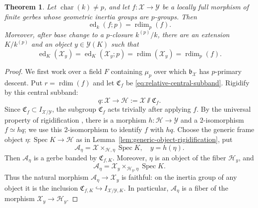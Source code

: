 \documentclass[11pt,reqno]{amsart}
\numberwithin{equation}{section}
\theoremstyle{plain}
\newtheorem{theo}[prop]{Theorem}
\theoremstyle{definition}
\def\cA{{\mathcal A}}
\def\cH{{\mathcal H}}
\def\cX{{\mathcal X}}
\def\cY{{\mathcal Y}}
\def\fC{{\mathfrak C}}
\def\Spec{{\operatorname{Spec}}}
\def\ra{{\rightarrow}}
\def\rdim{{\operatorname{rdim}}}
\def\ed{{\operatorname{ed}}}
\def\band{{\mathfrak b}}
\begin{document}
\begin{theo}\label{thm:relative-km-general}
Let $\operatorname{char}(k)\ne p$, and let
$f:\cX\to\cY$ be a locally full morphism of finite gerbes whose geometric
inertia groups are $p$-groups.  Then
\begin{equation}\label{eq:relative-km-general}
\ed_k(f;p)=\rdim_p(f).
\end{equation}
Moreover, after base change to a $p$-closure $k^{(p)}/k$, there are an
extension $K/k^{(p)}$ and an object $y\in\cY(K)$ such that
\begin{equation}\label{eq:relative-attainment}
\ed_K(\cX_y)=\ed_K(\cX_y;p)
=\rdim(\cX_y)=\rdim_p(f).
\end{equation}
\end{theo}

\begin{proof}
We first work over a field $F$ containing $\mu_p$ over which
$\band_{\cX}$ has $p$-primary descent.  Put $r=\rdim(f)$ and let
$\fC_f$ be \eqref{eq:relative-central-subband}.  Rigidify by this
central subband:
\[
q:\cX\ra\cH:=\cX\!\sslash\fC_f.
\]
Since $\fC_f\subset I_{\cX/\cY}$, the subgroup $\fC_f$ acts
trivially after applying $f$.  By the universal property of
rigidification \cite[Theorem~5.1.5]{ACV}, there is a morphism
$h:\cH\to\cY$ and a $2$-isomorphism $f\simeq hq$; we use this
$2$-isomorphism to identify $f$ with $hq$.  Choose the generic frame object
$\eta:\Spec K\to\cH$ as in
Lemma~\ref{lem:generic-object-rigidification}, put
\[
\cA_\eta=\cX\times_{\cH,\eta}\Spec K,
\quad y=h(\eta).
\]
Then $\cA_\eta$ is a gerbe banded by $\fC_{f,K}$.  Moreover,
$\eta$ is an object of the fiber $\cH_y$, and
\[
\cA_\eta
=\cX_y\times_{\cH_y,\eta}\Spec K.
\]
Thus the natural morphism $\cA_\eta\to\cX_y$ is faithful: on the
inertia group of any object it is the inclusion
$\fC_{f,K}\hookrightarrow I_{\cX/\cY,K}$.  In particular,
$\cA_\eta$ is a fiber of the morphism $\cX_y\to\cH_y$.


\end{proof}
\end{document}
